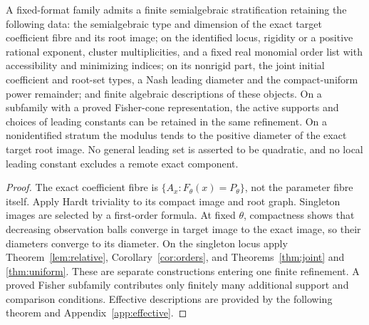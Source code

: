 \begin{theorem}\label{thm:atlas}
A fixed-format family admits a finite semialgebraic stratification
retaining the following data: the semialgebraic type and dimension of the
exact target coefficient fibre and its root image; on the identified
locus, rigidity or a positive rational exponent, cluster multiplicities,
and a fixed real monomial order list with accessibility and minimizing
indices; on its nonrigid part, the joint initial coefficient and root-set
types, a Nash leading diameter and the compact-uniform power remainder;
and finite algebraic descriptions of these objects. On a subfamily with
a proved Fisher-cone representation, the active supports and choices of
leading constants can be retained in the same refinement. On a
nonidentified stratum the modulus tends to the positive diameter of the
exact target root image. No general leading set is asserted to be
quadratic, and no local leading constant excludes a remote exact component.
\end{theorem}
\begin{proof}
The exact coefficient fibre is $\{A_x:F_\theta(x)=P_\theta\}$, not the
parameter fibre itself. Apply Hardt triviality to its compact image and
root graph. Singleton images are selected by a first-order formula.
At fixed $\theta$, compactness shows that decreasing observation balls
converge in target image to the exact image, so their diameters converge
to its diameter. On the singleton locus apply Theorem~\ref{lem:relative},
Corollary~\ref{cor:orders}, and Theorems~\ref{thm:joint} and
\ref{thm:uniform}. These are separate constructions entering one finite
refinement. A proved Fisher subfamily contributes only finitely many
additional support and comparison conditions. Effective descriptions are
provided by the following theorem and Appendix~\ref{app:effective}.
\end{proof}

